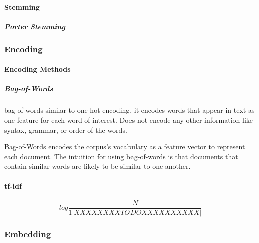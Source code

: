 \paragraph{Stemming}


\subparagraph{Porter Stemming}

\subsubsection{Encoding}

\paragraph{Encoding Methods}

\subparagraph{Bag-of-Words}

\r{{bag-of-words} similar to one-hot-encoding, it encodes words that appear in text as one feature for each word of interest. Does not encode any other information like syntax, grammar, or order of the words.}

\r{Bag-of-Words encodes the corpus's vocabulary as a feature vector to represent each document. The intuition for using bag-of-words is that documents that contain similar words are likely to be similar to one another.}


\paragraph{tf-idf}


\begin{equation}
{log\frac{N}{1|XXXXXXXXTODOXXXXXXXXXX|}}
\label{eq:tf_idf_def}
\end{equation}

\subsubsection{Embedding}



